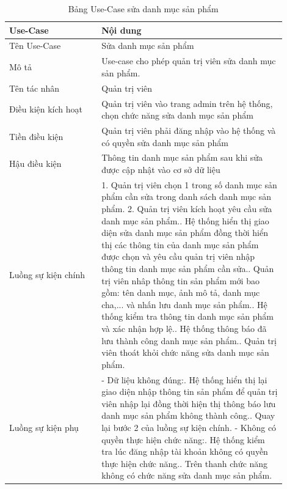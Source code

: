 \begin{longtable}[htp]{ |m{0.3\linewidth}|m{0.6\linewidth}|}
 \caption{Bảng Use-Case sửa danh mục sản phẩm \label{long}}\\
 \hline
 Use-Case & Nội dung \\
 \hline
 Tên Use-Case & Sửa danh mục sản phẩm \\
 \hline
 Mô tả & Use-case cho phép quản trị viên sửa danh mục sản phẩm.\\
 \hline
 Tên tác nhân & Quản trị viên\\
 \hline
 Điều kiện kích hoạt & Quản trị viên vào trang admin trên hệ thống, chọn chức năng sửa danh mục sản phẩm\\
 \hline
 Tiền điều kiện & Quản trị viên phải đăng nhập vào hệ thống và có quyền sửa danh mục sản phẩm\\
 \hline
 Hậu điều kiện & Thông tin danh mục sản phẩm sau khi sửa được cập nhật vào cơ sở dữ liệu\\
 \hline
 Luồng sự kiện chính & 
 1. Quản trị viên chọn 1 trong số danh mục sản phẩm cần sửa trong danh sách danh mục sản phẩm.
 2. Quản trị viên kích hoạt yêu cầu sửa danh mục sản phẩm.\newline
 3. Hệ thống hiển thị giao diện sửa danh mục sản phẩm đồng thời hiển thị các thông tin của danh mục sản phẩm được chọn và yêu cầu quản trị viên nhập thông tin danh mục sản phẩm cần sửa.\newline
 4. Quản trị viên nhâp thông tin sản phẩm mới bao gồm: tên danh mục, ảnh mô tả, danh mục cha,... và nhấn lưu danh mục sản phẩm.\newline
 5. Hệ thống kiểm tra thông tin danh mục sản phẩm và xác nhận hợp lệ.\newline
 6. Hệ thống thông báo đã lưu thành công danh mục sản phẩm.\newline	
 7. Quản trị viên thoát khỏi chức năng sửa danh mục sản phẩm.
 \\
 \hline
 Luồng sự kiện phụ & 
 - Dữ liệu không đúng:\newline
  1. Hệ thống hiển thị lại giao diện nhập thông tin sản phẩm để quản trị viên nhập lại đồng thời hiện thị thông báo lưu danh mục sản phẩm không thành công.\newline
  2. Quay lại bước 2 của luồng sự kiện chính.\newline
  - Không có quyền thực hiện chức năng:\newline
  1. Hệ thống kiểm tra lúc đăng nhập tài khoản không có quyền thực hiện chức năng.\newline
  2. Trên thanh chức năng không có chức năng sửa danh mục sản phẩm.
 \\
 \hline
\end{longtable}

